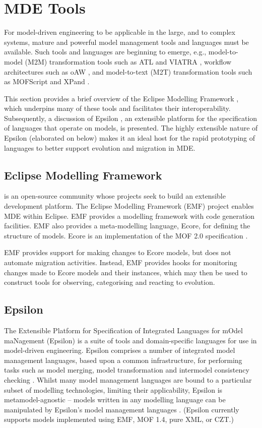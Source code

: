 
\section{MDE Tools}
\label{sec:mde_tools}
For model-driven engineering to be applicable in the large, and to complex systems, mature and powerful model management tools and languages must be available. Such tools and languages are beginning to emerge, e.g., model-to-
model (M2M) transformation tools such as ATL \cite{atl} and VIATRA \cite{viatra}, workflow architectures such as oAW \cite{oaw}, and model-to-text (M2T) transformation tools such as MOFScript \cite{oldevik05toward} and XPand \cite{xpand}.

This section provides a brief overview of the Eclipse Modelling Framework \cite{emf}, which underpins many of these tools and facilitates their interoperability. Subsequently, a discussion of Epsilon \cite{epsilon}, an extensible platform for the specification of languages that operate on models, is presented. The highly extensible nature of Epsilon (elaborated on below) makes it an ideal host for the rapid prototyping of languages to better support evolution and migration in MDE. 

\subsection{Eclipse Modelling Framework}
\cite{eclipse} is an open-source community whose projects seek to build an extensible development platform. The Eclipse Modelling Framework (EMF) project \cite{emf} enables MDE within Eclipse. EMF provides a modelling framework with code generation facilities. EMF also provides a meta-modelling language, Ecore, for defining the structure of models. Ecore is an implementation of the MOF 2.0 specification \cite{mof}.

EMF provides support for making changes to Ecore models, but does not automate migration activities. Instead, EMF provides hooks for monitoring changes made to Ecore models and their instances, which may then be used to construct tools for observing, categorising and reacting to evolution. 

\label{LitReview:Epsilon}
\subsection{Epsilon}
The Extensible Platform for Specification of Integrated Languages for mOdel maNagement (Epsilon) \cite{epsilon} is a suite of tools and domain-specific languages for use in model-driven engineering. Epsilon comprises a number of integrated model management languages, based upon a common infrastructure, for performing tasks such as model merging, model transformation and intermodel consistency checking \cite{kolovos06epsilondt}.  Whilst many model management languages are bound to a particular subset of modelling technologies, limiting their applicability, Epsilon is metamodel-agnostic -- models written in any modelling language can be manipulated by Epsilon's model management languages \cite{kolovos06eol}. (Epsilon currently supports models implemented using EMF, MOF 1.4, pure XML, or CZT.)

